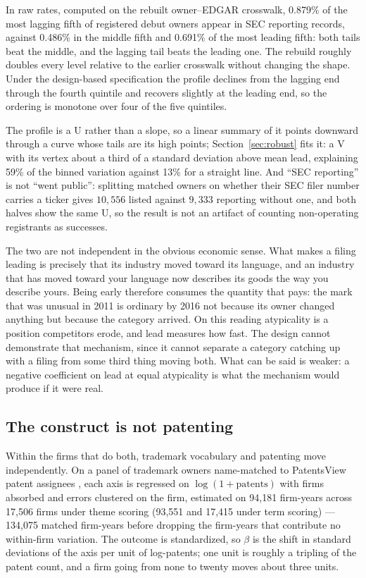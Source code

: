 In raw rates, computed on the rebuilt owner--EDGAR crosswalk, 0.879\% of the
most lagging fifth of registered debut owners appear in SEC reporting
records, against 0.486\% in the middle fifth and 0.691\% of the most leading
fifth: both tails beat the middle, and the lagging tail beats the leading
one. The rebuild roughly doubles every level relative to the earlier
crosswalk without changing the shape. Under the design-based specification the profile declines from the
lagging end through the fourth quintile and recovers slightly at the leading
end, so the ordering is monotone over four of the five quintiles.

The profile is a U rather than a slope, so a linear
summary of it points downward through a curve whose tails are its high
points; Section~\ref{sec:robust} fits it: a V with its vertex about a
third of a standard deviation above mean lead, explaining 59\% of the binned
variation against 13\% for a straight line. And ``SEC reporting'' is
not ``went public'': splitting matched owners on whether their SEC filer number carries a
ticker gives $10{,}556$ listed against $9{,}333$ reporting without one, and
both halves show the same U, so the result is not an artifact of counting
non-operating registrants as successes.

The two are not independent in the obvious economic sense. What makes a
filing leading is precisely that its industry moved toward its language, and
an industry that has moved toward your language now describes its goods the
way you describe yours. Being early therefore consumes the quantity that
pays: the mark that was unusual in 2011 is ordinary by 2016 not because its
owner changed anything but because the category arrived. On this reading
atypicality is a position competitors erode, and lead measures how fast.
The design cannot demonstrate that mechanism, since it cannot separate a
category catching up with a filing from some third thing moving both. What can
be said is weaker: a negative coefficient on lead at equal atypicality is what
the mechanism would produce if it were real.

\subsection{The construct is not patenting}\label{sec:patent}

Within the firms that do both, trademark vocabulary and patenting move
independently. On a panel of trademark owners name-matched to PatentsView
patent assignees \citep{PatentsView}, each axis is regressed on
$\log(1 + \mathrm{patents})$ with firms absorbed and errors clustered on the
firm, estimated on 94{,}181 firm-years across 17{,}506 firms under theme
scoring (93{,}551 and 17{,}415 under term scoring) --- 134{,}075 matched
firm-years before dropping the firm-years that contribute no within-firm
variation. The outcome is
standardized, so $\beta$ is the shift in standard deviations of the axis per
unit of log-patents; one unit is roughly a tripling of the patent count, and a
firm going from none to twenty moves about three units.


